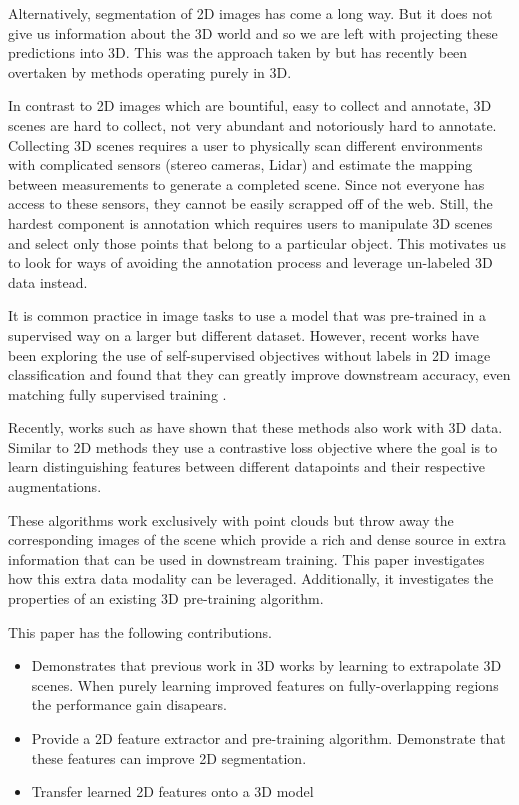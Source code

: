 \documentclass[10pt,twocolumn,letterpaper]{article}
\begin{document}
Alternatively, segmentation of 2D images has come a long way. But it does not give us information about the 3D world and so we are left with projecting these predictions into 3D. This was the approach taken by \cite{} but has recently been overtaken by methods operating purely in 3D.

In contrast to 2D images which are bountiful, easy to collect and annotate, 3D scenes are hard to collect, not very abundant and notoriously hard to annotate. Collecting 3D scenes requires a user to physically scan different environments with complicated sensors (\eg stereo cameras, Lidar) and estimate the mapping between measurements to generate a completed scene. Since not everyone has access to these sensors, they cannot be easily scrapped off of the web. Still, the hardest component is annotation which requires users to manipulate 3D scenes and select only those points that belong to a particular object. This motivates us to look for ways of avoiding the annotation process and leverage un-labeled 3D data instead.

It is common practice in image tasks to use a model that was pre-trained in a supervised way on a larger but different dataset. However, recent works have been exploring the use of self-supervised objectives without labels in 2D image classification and found that they can greatly improve downstream accuracy, even matching fully supervised training \cite{}.

Recently, works such as \cite{xie2020pointcontrast} have shown that these methods also work with 3D data. Similar to 2D methods they use a contrastive loss objective where the goal is to learn distinguishing features between different datapoints and their respective augmentations.

These algorithms work exclusively with point clouds but throw away the corresponding images of the scene which provide a rich and dense source in extra information that can be used in downstream training. This paper investigates how this extra data modality can be leveraged. Additionally, it investigates the properties of an existing 3D pre-training algorithm.

This paper has the following contributions.

\begin{itemize}
    \item Demonstrates that previous work in 3D \cite{xie2020pointcontrast} works by learning to extrapolate 3D scenes. When purely learning improved features on fully-overlapping regions the performance gain disapears.
    \item Provide a 2D feature extractor and pre-training algorithm. Demonstrate that these features can improve 2D segmentation.
    \item Transfer learned 2D features onto a 3D model
\end{itemize}
\end{document}
